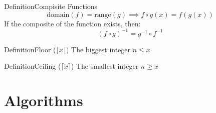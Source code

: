 \documentclass{MathNotes}
\newenvironment{definition}[1]{\begin{RedBox}{Definition}{#1}}{\end{RedBox}}
\begin{document}
\begin{definition}{Compisite Functions}\label{def:composite-function}
	\[\text{domain}(f)=\text{range}(g)\implies f\circ g(x)=f(g(x))\]
	If the composite of the function exists, then:
	\[(f\circ g)^{-1}=g^{-1}\circ f^{-1}\]
\end{definition}

\begin{multicols}{2}
\begin{definition}{Floor ($\lfloor x\rfloor$)}\label{def:floor-function}
	The biggest integer $n\leq x$
\end{definition}
\begin{definition}{Ceiling ($\lceil x\rceil$)}\label{def:floor-function}
	The smallest integer $n\geq x$
\end{definition}
\end{multicols}
\section{Algorithms}
\end{document}
